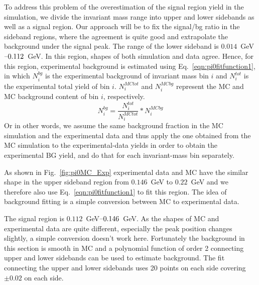 To address this problem of the overestimation of the signal region yield in the simulation, we divide the invariant mass range into upper and lower sidebands as well as a signal region. Our approach will be to fix the signal/bg ratio in the sideband regions, where the agreement is quite good and extrapolate the background under the signal peak.	 The range of the lower sideband is $0.014$~GeV$\textup{--}0.112$~GeV. In this region, shapes of both simulation and data agree. Hence, for this region, experimental background is estimated using Eq.~\eqref{eqn:pi0fitfunction1}, in which $N_i^{bg}$ is the experimental background of invariant mass bin $i$ and $N_i^{tot}$ is the experimental total yield of bin $i$. $N_i^{MCtot}$ and $N_i^{MCbg}$ represent the MC and MC background content of bin $i$, respectively.  
\begin{equation}
N_i^{bg}=\frac{N_i^{tot}}{N_i^{MCtot}}*N_i^{MCbg}
\label{eqn:pi0fitfunction1}
\end{equation}
Or in other words, we assume the same background fraction in the MC simulation and the experimental data and thus apply the one obtained from the MC simulation to the experimental-data yields in order to obtain the experimental BG yield, and do that for each invariant-mass bin separately.


As shown in Fig.~\ref{fig:pi0MC_Exp} experimental data and MC have the similar shape in the upper sideband region from $0.146$~GeV to $0.22$~GeV and we therefore also use Eq.~\eqref{eqn:pi0fitfunction1} to fit this region. The idea of background fitting is a simple conversion between MC to experimental data.

The signal region is $0.112$~GeV$\textup{--}0.146$~GeV. As the shapes of MC and experimental data are quite different, especially the peak position changes slightly, a simple conversion doesn't work here. Fortunately the background in this section is smooth in MC and a polynomial function of order 2 connecting upper and lower sidebands can be used to estimate background.
The fit connecting the upper and lower sidebands uses 20 points on each side covering $\pm 0.02$ on each side.

